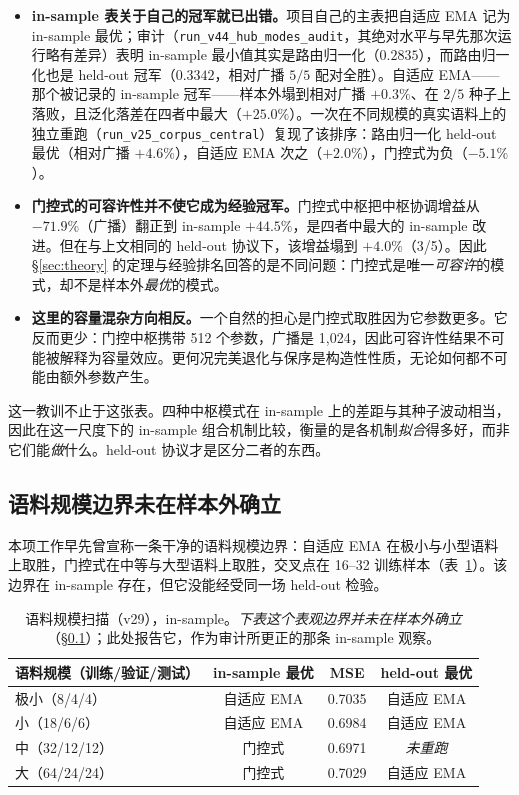 \documentclass[10pt,twoside]{article}
\theoremstyle{definition}
\theoremstyle{plain}
\theoremstyle{remark}
\begin{document}
\begin{itemize}[leftmargin=1.4em, itemsep=2pt]
    \item \textbf{in-sample 表关于自己的冠军就已出错。}项目自己的主表把自适应 EMA 记为 in-sample 最优；审计（\texttt{run\_v44\_hub\_modes\_audit}，其绝对水平与早先那次运行略有差异）表明 in-sample 最小值其实是路由归一化（$0.2835$），而路由归一化也是 held-out 冠军（$0.3342$，相对广播 $5/5$ 配对全胜）。自适应 EMA——那个被记录的 in-sample 冠军——样本外塌到相对广播 $+0.3\%$、在 $2/5$ 种子上落败，且泛化落差在四者中最大（$+25.0\%$）。一次在不同规模的真实语料上的独立重跑（\texttt{run\_v25\_corpus\_central}）复现了该排序：路由归一化 held-out 最优（相对广播 $+4.6\%$），自适应 EMA 次之（$+2.0\%$），门控式为负（$-5.1\%$）。
    \item \textbf{门控式的可容许性并不使它成为经验冠军。}门控式中枢把中枢协调增益从 $-71.9\%$（广播）翻正到 in-sample $+44.5\%$，是四者中最大的 in-sample 改进。但在与上文相同的 held-out 协议下，该增益塌到 $+4.0\%$（3/5）。因此 \S\ref{sec:theory} 的定理与经验排名回答的是不同问题：门控式是唯一\emph{可容许}的模式，却不是样本外\emph{最优}的模式。
    \item \textbf{这里的容量混杂方向相反。}一个自然的担心是门控式取胜因为它参数更多。它反而更少：门控中枢携带 512 个参数，广播是 1{,}024，因此可容许性结果不可能被解释为容量效应。更何况完美退化与保序是构造性性质，无论如何都不可能由额外参数产生。
\end{itemize}

这一教训不止于这张表。四种中枢模式在 in-sample 上的差距与其种子波动相当，因此在这一尺度下的 in-sample 组合机制比较，衡量的是各机制\emph{拟合}得多好，而非它们能\emph{做}什么。held-out 协议才是区分二者的东西。

\subsection{语料规模边界未在样本外确立}
\label{sec:corpus}

本项工作早先曾宣称一条干净的语料规模边界：自适应 EMA 在极小与小型语料上取胜，门控式在中等与大型语料上取胜，交叉点在 16--32 训练样本（表~\ref{tab:scale}）。该边界在 in-sample 存在，但它没能经受同一场 held-out 检验。

\begin{table}[htbp]
\centering
\caption{语料规模扫描（v29），in-sample。\emph{下表这个表观边界并未在样本外确立}（\S\ref{sec:corpus}）；此处报告它，作为审计所更正的那条 in-sample 观察。}
\label{tab:scale}
\small
\begin{tabular}{lccc}
\toprule
\textbf{语料规模（训练/验证/测试）} & \textbf{in-sample 最优} & \textbf{MSE} & \textbf{held-out 最优} \\
\midrule
极小（8/4/4） & 自适应 EMA & 0.7035 & 自适应 EMA \\
小（18/6/6） & 自适应 EMA & 0.6984 & 自适应 EMA \\
中（32/12/12） & 门控式 & 0.6971 & \emph{未重跑} \\
大（64/24/24） & 门控式 & 0.7029 & 自适应 EMA \\
\bottomrule
\end{tabular}
\end{table}
\end{document}

